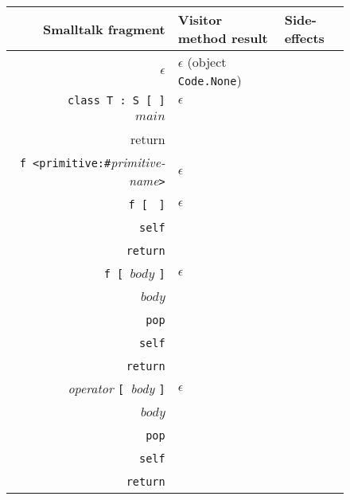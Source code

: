 \documentclass[11pt]{article}
\begin{document}
\begin{figure}
\begin{center}
\begin{tabular}[t]{r | l | l }
{\bf Smalltalk fragment} & {\bf Visitor method result} & {\bf Side-effects}\\
\hline
$\epsilon$ & $\epsilon$ (object {\tt Code.None}) & \\

{\tt class T : S [ ]} & $\epsilon$ & \\

$main$  & 
\begin{minipage}[t]{0.25\linewidth}
$main$\\
{\tt self\\
return}\vspace{5pt}
\end{minipage} & \\

{\tt f <primitive:\#}{\it primitive-name}{\tt >} &
\begin{minipage}[t]{0.35\linewidth}
$\epsilon$ \vspace{7pt}
\end{minipage} &  \\

{\tt f [ } {\tt ]} & $\epsilon$&
\begin{minipage}[t]{0.35\linewidth}
$\text{\tt f}_{\text{\it code}} =$ \\
\parbox{20pt}{~}{\tt self}\\
\parbox{20pt}{~}{\tt return}
\end{minipage} \\

{\tt f [ }$body$ {\tt ]} & $\epsilon$&
\begin{minipage}[t]{0.35\linewidth}
$\text{\tt f}_{\text{\it code}} =$ \\
\parbox{20pt}{~}$body$\\
\parbox{20pt}{~}{\tt pop}\\
\parbox{20pt}{~}{\tt self}\\
\parbox{20pt}{~}{\tt return}
\end{minipage} \\

{\it operator} {\tt [ }{\it body} {\tt ]} & $\epsilon$&
\begin{minipage}[t]{0.35\linewidth}
$\text{\it operator}_{\text{\it code}} =$ \\
\parbox{20pt}{~}$body$\\
\parbox{20pt}{~}{\tt pop}\\
\parbox{20pt}{~}{\tt self}\\
\parbox{20pt}{~}{\tt return}
\end{minipage} \\


\end{tabular}
\end{center}
\end{figure}
\end{document}
